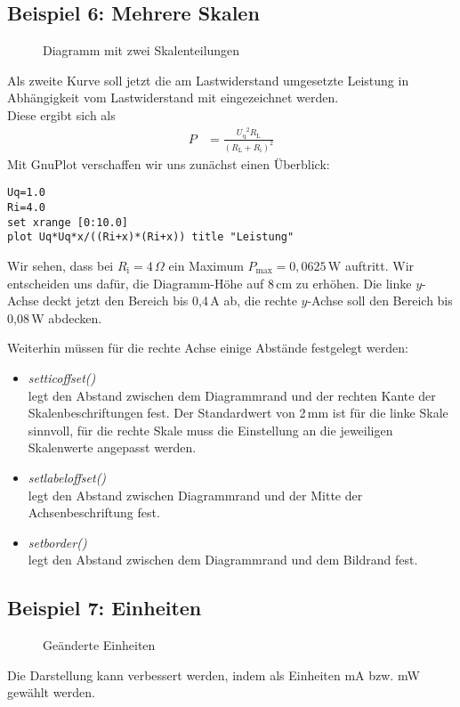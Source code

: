 \documentclass[ngerman,origlongtable]{scrartcl}
\newcommand{\includepgfimage}[2]{%
\begin{figure}%
{\centering%
\caption{#2}\label{fig:#1}%
}%
\end{figure}%
}
\begin{document}
\subsection[Zwei Skalen]{Beispiel 6: Mehrere Skalen}
\includepgfimage{../examples/test006a}{Diagramm mit zwei Skalenteilungen}
Als zweite Kurve soll jetzt die am Lastwiderstand umgesetzte Leistung
in Abhängigkeit vom Lastwiderstand mit eingezeichnet werden.\\
Diese ergibt sich als
\begin{align*}P&=\frac{{U_{\text{q}}}^2R_{\text{L}}}{{(R_{\text{L}}+R_{\text{i}})}^2}\end{align*}
Mit GnuPlot verschaffen wir uns zunächst einen Überblick:
\begin{lstlisting}[language=GnuPlot]
Uq=1.0
Ri=4.0
set xrange [0:10.0]
plot Uq*Uq*x/((Ri+x)*(Ri+x)) title "Leistung"
\end{lstlisting}
Wir sehen, dass bei \(R_{\text{i}}=4\,\Omega\) ein Maximum
\(P_{\text{max}}=0,0625\,\text{W}\) auftritt.
Wir entscheiden uns dafür, die Diagramm-Höhe auf 8\,cm zu erhöhen. Die
linke \(y\)-Achse deckt jetzt den Bereich bis 0,4\,A ab, die rechte
\(y\)-Achse soll den Bereich bis 0,08\,W abdecken.

Weiterhin müssen für die rechte Achse einige Abstände festgelegt werden:
\begin{itemize}
\item	\textit{set\textunderscore{}tic\textunderscore{}offset()\/}\\
legt den Abstand zwischen dem Diagrammrand und der rechten Kante der
Skalenbeschriftungen fest. Der Standardwert von 2\,mm ist für die linke
Skale sinnvoll, für die rechte Skale muss die Einstellung an die jeweiligen
Skalenwerte angepasst werden.
\item	\textit{set\textunderscore{}label\textunderscore{}offset()\/}\\
legt den Abstand zwischen Diagrammrand und der Mitte der Achsenbeschriftung
fest.
\item	\textit{set\textunderscore{}border()\/}\\
legt den Abstand zwischen dem Diagrammrand und dem Bildrand fest.
\end{itemize}

\clearpage
\subsection[Einheiten]{Beispiel 7: Einheiten}
\includepgfimage{../examples/test007a}{Geänderte Einheiten}
Die Darstellung kann verbessert werden, indem als Einheiten mA bzw.
mW gewählt werden.
\end{document}
